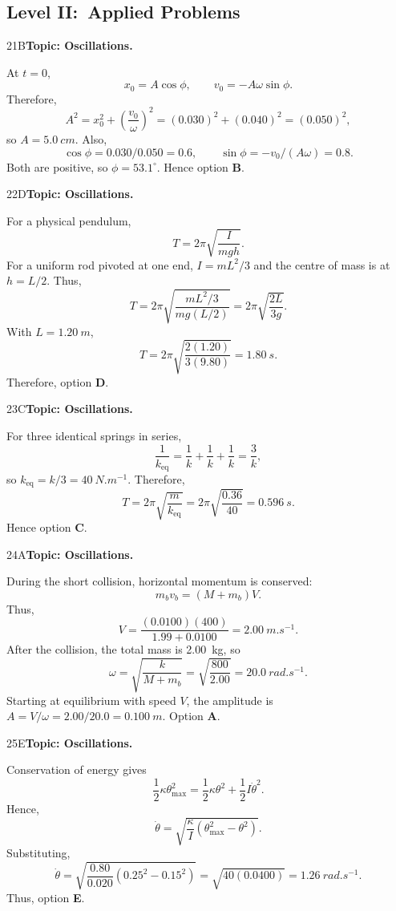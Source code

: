 \documentclass[10pt,a4paper]{physicsquiz}
\begin{document}
\subsection{Level II:\ Applied Problems}
\begin{workedsolution}{21}{B}\textbf{Topic: Oscillations.}\par At \(t=0\),
  \[
    x_0=A\cos\phi,\qquad v_0=-A\omega\sin\phi.
  \]
  Therefore,
  \[
    A^2=x_0^2+{\left(\frac{v_0}{\omega}\right)}^2
    ={(0.030)}^2+{(0.040)}^2={(0.050)}^2,
  \]
  so \(A=\SI{5.0}{cm}\). Also,
  \[
    \cos\phi=0.030/0.050=0.6,
    \qquad
    \sin\phi=-v_0/(A\omega)=0.8.
  \]
  Both are positive, so \(\phi=53.1^\circ\). Hence option \textbf{B}.\end{workedsolution}
\begin{workedsolution}{22}{D}\textbf{Topic: Oscillations.}\par For a physical pendulum,
  \[
    T=2\pi\sqrt{\frac{I}{mgh}}.
  \]
  For a uniform rod pivoted at one end, \(I=mL^2/3\) and the centre of mass is at \(h=L/2\). Thus,
  \[
    T=2\pi\sqrt{\frac{mL^2/3}{mg(L/2)}}
    =2\pi\sqrt{\frac{2L}{3g}}.
  \]
  With \(L=\SI{1.20}{m}\),
  \[
    T=2\pi\sqrt{\frac{2(1.20)}{3(9.80)}}=\SI{1.80}{s}.
  \]
  Therefore, option \textbf{D}.\end{workedsolution}
\begin{workedsolution}{23}{C}\textbf{Topic: Oscillations.}\par For three identical springs in series,
  \[
    \frac{1}{k_{\mathrm{eq}}}=\frac{1}{k}+\frac{1}{k}+\frac{1}{k}=\frac{3}{k},
  \]
  so \(k_{\mathrm{eq}}=k/3=\SI{40}{N.m^{-1}}\). Therefore,
  \[
    T=2\pi\sqrt{\frac{m}{k_{\mathrm{eq}}}}
    =2\pi\sqrt{\frac{0.36}{40}}
    =\SI{0.596}{s}.
  \]
  Hence option \textbf{C}.\end{workedsolution}
\begin{workedsolution}{24}{A}\textbf{Topic: Oscillations.}\par During the short collision, horizontal momentum is conserved:
  \[
    m_{b}v_{b}=(M+m_{b})V.
  \]
  Thus,
  \[
    V=\frac{(0.0100)(400)}{1.99+0.0100}=\SI{2.00}{m.s^{-1}}.
  \]
  After the collision, the total mass is \SI{2.00}{kg}, so
  \[
    \omega=\sqrt{\frac{k}{M+m_b}}=\sqrt{\frac{800}{2.00}}=\SI{20.0}{rad.s^{-1}}.
  \]
  Starting at equilibrium with speed \(V\), the amplitude is \(A=V/\omega=2.00/20.0=\SI{0.100}{m}\). Option \textbf{A}.\end{workedsolution}
\begin{workedsolution}{25}{E}\textbf{Topic: Oscillations.}\par Conservation of energy gives
  \[
    \frac12\kappa\theta_{\max}^2
    =\frac12\kappa\theta^2+\frac12I\dot\theta^2.
  \]
  Hence,
  \[
    \dot\theta=\sqrt{\frac{\kappa}{I}\left(\theta_{\max}^2-\theta^2\right)}.
  \]
  Substituting,
  \[
    \dot\theta=\sqrt{\frac{0.80}{0.020}\left(0.25^2-0.15^2\right)}
    =\sqrt{40(0.0400)}
    =\SI{1.26}{rad.s^{-1}}.
  \]
  Thus, option \textbf{E}.\end{workedsolution}
\end{document}
